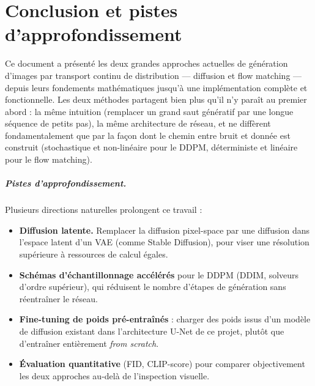 \chapter*{Conclusion et pistes d'approfondissement}

Ce document a présenté les deux grandes approches actuelles de génération d'images par transport
continu de distribution — diffusion et flow matching — depuis leurs fondements mathématiques jusqu'à
une implémentation complète et fonctionnelle. Les deux méthodes partagent bien plus qu'il n'y paraît
au premier abord : la même intuition (remplacer un grand saut génératif par une longue séquence de
petits pas), la même architecture de réseau, et ne diffèrent fondamentalement que par la façon dont le
chemin entre bruit et donnée est construit (stochastique et non-linéaire pour le DDPM, déterministe et
linéaire pour le flow matching).

\paragraph{Pistes d'approfondissement.} Plusieurs directions naturelles prolongent ce travail :
\begin{itemize}
    \item \textbf{Diffusion latente.} Remplacer la diffusion pixel-space par une diffusion dans
    l'espace latent d'un VAE (comme Stable Diffusion), pour viser une résolution supérieure à
    ressources de calcul égales.
    \item \textbf{Schémas d'échantillonnage accélérés} pour le DDPM (DDIM, solveurs d'ordre supérieur),
    qui réduisent le nombre d'étapes de génération sans réentraîner le réseau.
    \item \textbf{Fine-tuning de poids pré-entraînés} : charger des poids issus d'un modèle de
    diffusion existant dans l'architecture U-Net de ce projet, plutôt que d'entraîner entièrement
    \emph{from scratch}.
    \item \textbf{Évaluation quantitative} (FID, CLIP-score) pour comparer objectivement les deux
    approches au-delà de l'inspection visuelle.
\end{itemize}

